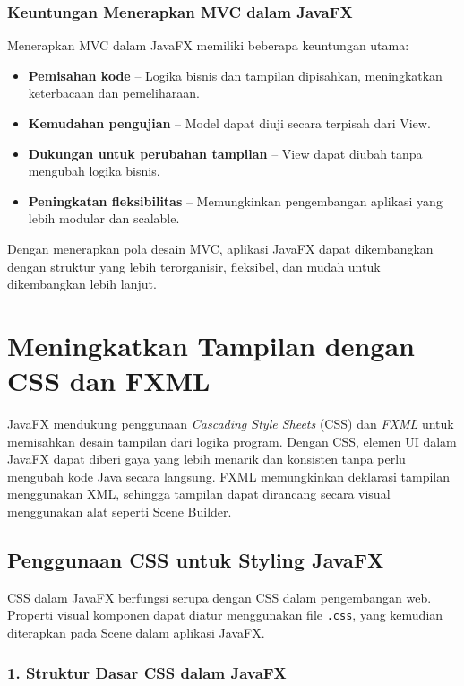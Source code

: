 \subsubsection{Keuntungan Menerapkan MVC dalam JavaFX}

Menerapkan MVC dalam JavaFX memiliki beberapa keuntungan utama:
\begin{itemize}
	\item \textbf{Pemisahan kode} – Logika bisnis dan tampilan dipisahkan, meningkatkan keterbacaan dan pemeliharaan.
	\item \textbf{Kemudahan pengujian} – Model dapat diuji secara terpisah dari View.
	\item \textbf{Dukungan untuk perubahan tampilan} – View dapat diubah tanpa mengubah logika bisnis.
	\item \textbf{Peningkatan fleksibilitas} – Memungkinkan pengembangan aplikasi yang lebih modular dan scalable.
\end{itemize}

Dengan menerapkan pola desain MVC, aplikasi JavaFX dapat dikembangkan dengan struktur yang lebih terorganisir, fleksibel, dan mudah untuk dikembangkan lebih lanjut.

\section{Meningkatkan Tampilan dengan CSS dan FXML}

JavaFX mendukung penggunaan \textit{Cascading Style Sheets} (CSS) dan \textit{FXML} untuk memisahkan desain tampilan dari logika program. Dengan CSS, elemen UI dalam JavaFX dapat diberi gaya yang lebih menarik dan konsisten tanpa perlu mengubah kode Java secara langsung. FXML memungkinkan deklarasi tampilan menggunakan XML, sehingga tampilan dapat dirancang secara visual menggunakan alat seperti Scene Builder.

\subsection{Penggunaan CSS untuk Styling JavaFX}

CSS dalam JavaFX berfungsi serupa dengan CSS dalam pengembangan web. Properti visual komponen dapat diatur menggunakan file \texttt{.css}, yang kemudian diterapkan pada Scene dalam aplikasi JavaFX.

\subsubsection{1. Struktur Dasar CSS dalam JavaFX}

